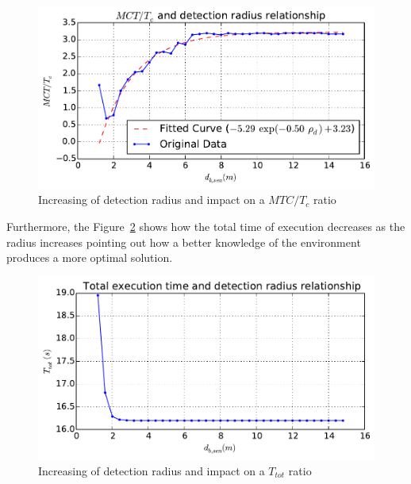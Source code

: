 \documentclass[eprint]{actapoly}
\begin{document}
\begin{figure}[!h]\centering
  \includegraphics[width=\linewidth]{./images/drho/drho-rmp.pdf} %
  \caption{Increasing of detection radius and impact on a $MTC/T_c$ 
ratio\label{fig:drhormp}}
\end{figure}

Furthermore, the Figure~\ref{fig:drhotot} shows how the total time of execution
decreases as the radius increases pointing out how a better knowledge of the
environment produces a more optimal solution.


\begin{figure}[!h]\centering
  \includegraphics[width=\linewidth]{./images/drho/drho-tot.pdf}
  \caption{Increasing of detection radius and impact on a $T_{tot}$ 
ratio\label{fig:drhotot}}
\end{figure}
\end{document}
